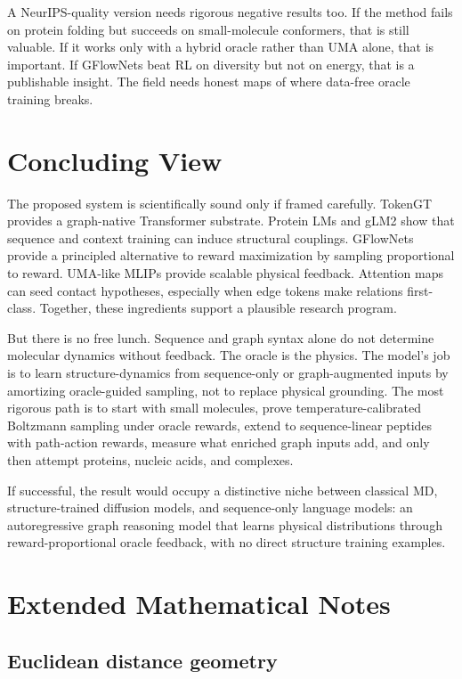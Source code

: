 \documentclass[11pt]{article}
\begin{document}
A NeurIPS-quality version needs rigorous negative results too. If the method fails on protein folding but succeeds on small-molecule conformers, that is still valuable. If it works only with a hybrid oracle rather than UMA alone, that is important. If GFlowNets beat RL on diversity but not on energy, that is a publishable insight. The field needs honest maps of where data-free oracle training breaks.

\section{Concluding View}

The proposed system is scientifically sound only if framed carefully. TokenGT provides a graph-native Transformer substrate. Protein LMs and gLM2 show that sequence and context training can induce structural couplings. GFlowNets provide a principled alternative to reward maximization by sampling proportional to reward. UMA-like MLIPs provide scalable physical feedback. Attention maps can seed contact hypotheses, especially when edge tokens make relations first-class. Together, these ingredients support a plausible research program.

But there is no free lunch. Sequence and graph syntax alone do not determine molecular dynamics without feedback. The oracle is the physics. The model's job is to learn structure-dynamics from sequence-only or graph-augmented inputs by amortizing oracle-guided sampling, not to replace physical grounding. The most rigorous path is to start with small molecules, prove temperature-calibrated Boltzmann sampling under oracle rewards, extend to sequence-linear peptides with path-action rewards, measure what enriched graph inputs add, and only then attempt proteins, nucleic acids, and complexes.

If successful, the result would occupy a distinctive niche between classical MD, structure-trained diffusion models, and sequence-only language models: an autoregressive graph reasoning model that learns physical distributions through reward-proportional oracle feedback, with no direct structure training examples.

\appendix
\newpage
\section{Extended Mathematical Notes}

\subsection{Euclidean distance geometry}
\end{document}
